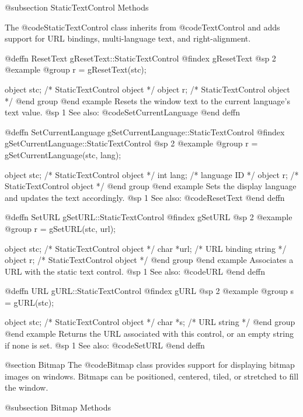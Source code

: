 @subsection StaticTextControl Methods

The @code{StaticTextControl} class inherits from @code{TextControl} and
adds support for URL bindings, multi-language text, and right-alignment.



@deffn {ResetText} gResetText::StaticTextControl
@findex gResetText
@sp 2
@example
@group
r = gResetText(stc);

object  stc;   /*  StaticTextControl object  */
object  r;     /*  StaticTextControl object  */
@end group
@end example
Resets the window text to the current language's text value.
@sp 1
See also:  @code{SetCurrentLanguage}
@end deffn



@deffn {SetCurrentLanguage} gSetCurrentLanguage::StaticTextControl
@findex gSetCurrentLanguage::StaticTextControl
@sp 2
@example
@group
r = gSetCurrentLanguage(stc, lang);

object  stc;    /*  StaticTextControl object  */
int     lang;   /*  language ID               */
object  r;      /*  StaticTextControl object  */
@end group
@end example
Sets the display language and updates the text accordingly.
@sp 1
See also:  @code{ResetText}
@end deffn



@deffn {SetURL} gSetURL::StaticTextControl
@findex gSetURL
@sp 2
@example
@group
r = gSetURL(stc, url);

object  stc;    /*  StaticTextControl object  */
char    *url;   /*  URL binding string        */
object  r;      /*  StaticTextControl object  */
@end group
@end example
Associates a URL with the static text control.
@sp 1
See also:  @code{URL}
@end deffn



@deffn {URL} gURL::StaticTextControl
@findex gURL
@sp 2
@example
@group
s = gURL(stc);

object  stc;   /*  StaticTextControl object  */
char    *s;    /*  URL string                */
@end group
@end example
Returns the URL associated with this control, or an empty string if
none is set.
@sp 1
See also:  @code{SetURL}
@end deffn




@section Bitmap
The @code{Bitmap} class provides support for displaying bitmap images on
windows.  Bitmaps can be positioned, centered, tiled, or stretched to
fill the window.

@subsection Bitmap Methods



